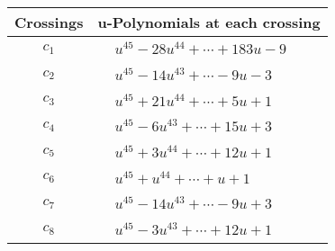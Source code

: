\documentclass[1p]{elsarticle_modified}
\theoremstyle{definition}
\begin{document}
\begin{tabular}{m{50pt}|m{274pt}}
Crossings & \hspace{64pt}u-Polynomials at each crossing \\
\hline $$\begin{aligned}c_{1}\end{aligned}$$&$\begin{aligned}
&u^{45}-28 u^{44}+\cdots+183 u-9
\end{aligned}$\\
\hline $$\begin{aligned}c_{2}\end{aligned}$$&$\begin{aligned}
&u^{45}-14 u^{43}+\cdots-9 u-3
\end{aligned}$\\
\hline $$\begin{aligned}c_{3}\end{aligned}$$&$\begin{aligned}
&u^{45}+21 u^{44}+\cdots+5 u+1
\end{aligned}$\\
\hline $$\begin{aligned}c_{4}\end{aligned}$$&$\begin{aligned}
&u^{45}-6 u^{43}+\cdots+15 u+3
\end{aligned}$\\
\hline $$\begin{aligned}c_{5}\end{aligned}$$&$\begin{aligned}
&u^{45}+3 u^{44}+\cdots+12 u+1
\end{aligned}$\\
\hline $$\begin{aligned}c_{6}\end{aligned}$$&$\begin{aligned}
&u^{45}+u^{44}+\cdots+u+1
\end{aligned}$\\
\hline $$\begin{aligned}c_{7}\end{aligned}$$&$\begin{aligned}
&u^{45}-14 u^{43}+\cdots-9 u+3
\end{aligned}$\\
\hline $$\begin{aligned}c_{8}\end{aligned}$$&$\begin{aligned}
&u^{45}-3 u^{43}+\cdots+12 u+1
\end{aligned}$\\

\end{tabular}
\end{document}
